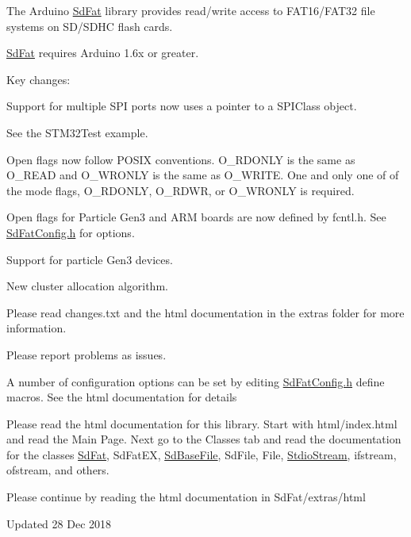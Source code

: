 The Arduino \mbox{\hyperlink{class_sd_fat}{Sd\+Fat}} library provides read/write access to FAT16/\+FAT32 file systems on SD/\+SDHC flash cards.

\mbox{\hyperlink{class_sd_fat}{Sd\+Fat}} requires Arduino 1.\+6x or greater.

Key changes\+:

Support for multiple SPI ports now uses a pointer to a SPIClass object.

See the STM32\+Test example. 
\begin{DoxyCode}{0}

\end{DoxyCode}


Open flags now follow POSIX conventions. O\+\_\+\+RDONLY is the same as O\+\_\+\+READ and O\+\_\+\+WRONLY is the same as O\+\_\+\+WRITE. One and only one of of the mode flags, O\+\_\+\+RDONLY, O\+\_\+\+RDWR, or O\+\_\+\+WRONLY is required.

Open flags for Particle Gen3 and ARM boards are now defined by fcntl.\+h. See \mbox{\hyperlink{_sd_fat_config_8h}{Sd\+Fat\+Config.\+h}} for options.

Support for particle Gen3 devices.

New cluster allocation algorithm.

Please read changes.\+txt and the html documentation in the extras folder for more information.

Please report problems as issues.

A number of configuration options can be set by editing \mbox{\hyperlink{_sd_fat_config_8h}{Sd\+Fat\+Config.\+h}} define macros. See the html documentation for details

Please read the html documentation for this library. Start with html/index.\+html and read the Main Page. Next go to the Classes tab and read the documentation for the classes \mbox{\hyperlink{class_sd_fat}{Sd\+Fat}}, Sd\+Fat\+EX, \mbox{\hyperlink{class_sd_base_file}{Sd\+Base\+File}}, Sd\+File, File, \mbox{\hyperlink{class_stdio_stream}{Stdio\+Stream}}, ifstream, ofstream, and others.

Please continue by reading the html documentation in Sd\+Fat/extras/html

Updated 28 Dec 2018 
